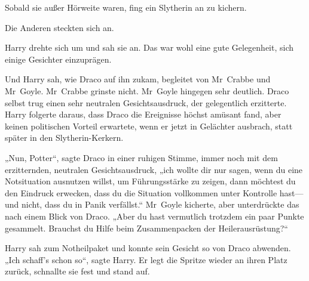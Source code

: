 Sobald sie außer Hörweite waren, fing ein Slytherin an zu kichern.

Die Anderen steckten sich an.

Harry drehte sich um und sah sie an. Das war wohl eine gute Gelegenheit, sich einige Gesichter einzuprägen.

Und Harry sah, wie Draco auf ihn zukam, begleitet von Mr~Crabbe und Mr~Goyle. Mr~Crabbe grinste nicht. Mr~Goyle hingegen sehr deutlich. Draco selbst trug einen sehr neutralen Gesichtsausdruck, der gelegentlich erzitterte. Harry folgerte daraus, dass Draco die Ereignisse höchst amüsant fand, aber keinen politischen Vorteil erwartete, wenn er jetzt in Gelächter ausbrach, statt später in den Slytherin-Kerkern.

„Nun, Potter“, sagte Draco in einer ruhigen Stimme, immer noch mit dem erzitternden, neutralen Gesichtsausdruck, „ich wollte dir nur sagen, wenn du eine Notsituation ausnutzen willst, um Führungsstärke zu zeigen, dann möchtest du den Eindruck erwecken, dass du die Situation vollkommen unter Kontrolle hast—und nicht, dass du in Panik verfällst.“ Mr~Goyle kicherte, aber unterdrückte das nach einem Blick von Draco. „Aber du hast vermutlich trotzdem ein paar Punkte gesammelt. Brauchst du Hilfe beim Zusammenpacken der Heilerausrüstung?“

Harry sah zum Notheilpaket und konnte sein Gesicht so von Draco abwenden. „Ich schaff’s schon so“, sagte Harry. Er legt die Spritze wieder an ihren Platz zurück, schnallte sie fest und stand auf.


